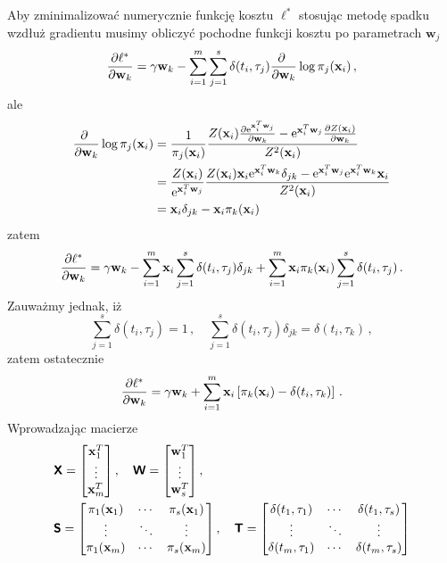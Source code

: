 \documentclass{myclass}
\begin{document}
Aby zminimalizować numerycznie funkcję kosztu \(\ell^*\) stosując metodę spadku wzdłuż gradientu
musimy obliczyć pochodne funkcji kosztu po parametrach \(\mathbf{w}_j\)
\begin{equation*}
    \pdv{\ell^*}{\mathbf{w}_k} = \gamma\mathbf{w}_k - \sum_{i=1}^m\sum_{j=1}^s \delta(t_i,\tau_j)\pdv{~}{\mathbf{w}_k}\log\pi_j(\mathbf{x}_i)\,,
\end{equation*}
ale
\begin{equation*}
    \begin{split}
        \pdv{~}{\mathbf{w}_k}\log\pi_j(\mathbf{x}_i) &= \frac{1}{\pi_j(\mathbf{x}_i)}\frac{Z(\mathbf{x}_i)\pdv{\mathrm{e}^{\mathbf{x}_i^T\mathbf{w}_j}}{\mathbf{w}_k} - \mathrm{e}^{\mathbf{x}_i^T\mathbf{w}_j}\pdv{Z(\mathbf{x}_i)}{\mathbf{w}_k}}{Z^2(\mathbf{x}_i)}\\
        &= \frac{Z(\mathbf{x}_i)}{\mathrm{e}^{\mathbf{x}_i^T\mathbf{w}_j}}\frac{Z(\mathbf{x}_i)\mathbf{x}_i\mathrm{e}^{\mathbf{x}_i^T\mathbf{w}_k}\delta_{jk} - \mathrm{e}^{\mathbf{x}_i^T\mathbf{w}_j}\mathrm{e}^{\mathbf{x}_i^T\mathbf{w}_k}\mathbf{x}_i}{Z^2(\mathbf{x}_i)}\\
        &= \mathbf{x}_i\delta_{jk} - \mathbf{x}_i\pi_k(\mathbf{x}_i)
    \end{split}
\end{equation*}
zatem
\begin{equation*}
    \pdv{\ell^*}{\mathbf{w}_k} = \gamma\mathbf{w}_k - \sum_{i=1}^m\mathbf{x}_i\sum_{j=1}^s \delta(t_i, \tau_j)\delta_{jk} + \sum_{i=1}^m\mathbf{x}_i\pi_k(\mathbf{x}_i)\sum_{j=1}^s\delta(t_i, \tau_j)\,.
\end{equation*}
Zauważmy jednak, iż
\begin{equation*}
    \sum_{j=1}^s\delta(t_i, \tau_j) = 1\,,\quad \sum_{j=1}^s \delta(t_i, \tau_j)\delta_{jk} = \delta(t_i, \tau_k)\,,
\end{equation*}
zatem ostatecznie
\begin{equation*}
    \pdv{\ell^*}{\mathbf{w}_k} = \gamma\mathbf{w}_k + \sum_{i=1}^m \mathbf{x}_i\left[\pi_k(\mathbf{x}_i) - \delta(t_i, \tau_k)\right]\,.
\end{equation*}
Wprowadzając macierze
\begin{equation*}
    \begin{split}
        &\oper{X} = \mqty[\mathbf{x}_1^T \\ \vdots \\ \mathbf{x}_m^T]\,,\quad \oper{W} = \mqty[\mathbf{w}_1^T \\ \vdots \\ \mathbf{w}_s^T]\,,\\
        &\oper{S} = \mqty[\pi_1(\mathbf{x}_1) & \cdots & \pi_s(\mathbf{x}_1) \\ \vdots & \ddots & \vdots \\ \pi_1(\mathbf{x}_m) & \cdots & \pi_s(\mathbf{x}_m)]\,,\quad \oper{T} = \mqty[\delta(t_1,\tau_1) & \cdots & \delta(t_1,\tau_s) \\ \vdots & \ddots & \vdots \\ \delta(t_m, \tau_1) & \cdots & \delta(t_m, \tau_s)]
    \end{split}
\end{equation*}
\end{document}
